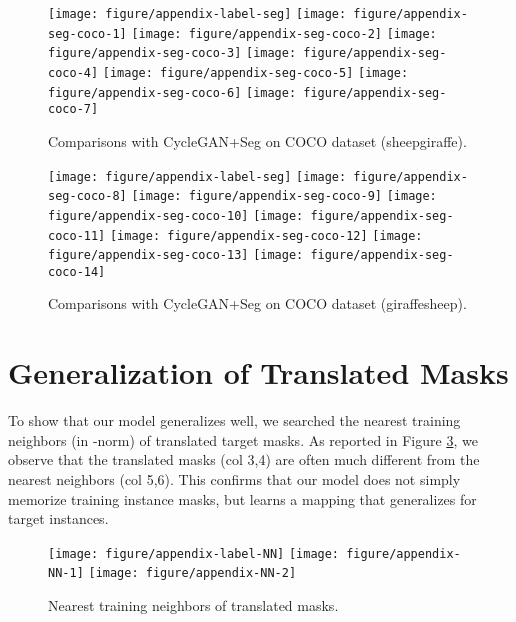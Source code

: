 \documentclass{article} \usepackage{iclr2019_conference,times}
\begin{document}
\begin{figure}[H]
	\centering
	\texttt{[image: figure/appendix-label-seg]}
	\texttt{[image: figure/appendix-seg-coco-1]}
    \texttt{[image: figure/appendix-seg-coco-2]}
    \texttt{[image: figure/appendix-seg-coco-3]}
    \texttt{[image: figure/appendix-seg-coco-4]}
    \texttt{[image: figure/appendix-seg-coco-5]}
    \texttt{[image: figure/appendix-seg-coco-6]}
    \texttt{[image: figure/appendix-seg-coco-7]}
	\caption{
	Comparisons with CycleGAN+Seg on COCO dataset (sheepgiraffe).
	} \label{fig:more-cycleganseg-coco-1}
\end{figure}

\begin{figure}[H]
	\centering
	\texttt{[image: figure/appendix-label-seg]}
	\texttt{[image: figure/appendix-seg-coco-8]}
    \texttt{[image: figure/appendix-seg-coco-9]}
    \texttt{[image: figure/appendix-seg-coco-10]}
    \texttt{[image: figure/appendix-seg-coco-11]}
    \texttt{[image: figure/appendix-seg-coco-12]}
    \texttt{[image: figure/appendix-seg-coco-13]}
    \texttt{[image: figure/appendix-seg-coco-14]}
	\caption{
	Comparisons with CycleGAN+Seg on COCO dataset (giraffesheep).
	} \label{fig:more-cycleganseg-coco-2}
\end{figure}


\newpage
\section{Generalization of Translated Masks}
\label{sec:nearest-neighbor}

To show that our model generalizes well,
we searched the nearest training neighbors (in -norm) of translated target masks.
As reported in Figure \ref{fig:nearest-neighbor}, we observe that the translated masks (col 3,4) are often much different from the nearest neighbors (col 5,6).
This confirms that our model does not simply memorize training instance masks, but learns a mapping that generalizes for target instances.

\begin{figure}[H]
	\centering
	\texttt{[image: figure/appendix-label-NN]}
	\texttt{[image: figure/appendix-NN-1]}
    \texttt{[image: figure/appendix-NN-2]}
	\caption{
	Nearest training neighbors of translated masks.
	} \label{fig:nearest-neighbor}
\end{figure}
\end{document}
